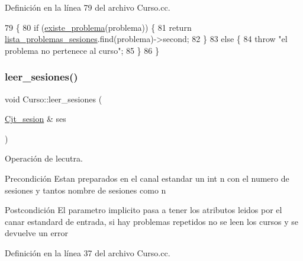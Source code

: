 Definición en la línea 79 del archivo Curso.\+cc.


\begin{DoxyCode}
79                                                        \{
80   \textcolor{keywordflow}{if} (\mbox{\hyperlink{class_curso_ac697ad831382b4e3ccd85365e835344f}{existe\_problema}}(problema)) \{
81     \textcolor{keywordflow}{return} \mbox{\hyperlink{class_curso_a99375622457c06d91cdeede8686f6da5}{lista\_problemas\_sesiones}}.find(problema)->second;
82   \}
83   \textcolor{keywordflow}{else} \{
84     \textcolor{keywordflow}{throw} \textcolor{stringliteral}{"el problema no pertenece al curso"};
85   \}
86 \}
\end{DoxyCode}
\mbox{\label{class_curso_ad60de4c73f3ce9195c0f681f508f83c8}} 
\subsubsection{\texorpdfstring{leer\+\_\+sesiones()}{leer\_sesiones()}}
{\footnotesize\ttfamily void Curso\+::leer\+\_\+sesiones (\begin{DoxyParamCaption}\item[{\mbox{\hyperlink{class_cjt__sesion}{Cjt\+\_\+sesion}} \&}]{ses }\end{DoxyParamCaption})}



Operación de lecutra. 

\begin{DoxyPrecond}{Precondición}
Estan preparados en el canal estandar un int n con el numero de sesiones y tantos nombre de sesiones como n 
\end{DoxyPrecond}
\begin{DoxyPostcond}{Postcondición}
El parametro implicito pasa a tener los atributos leidos por el canar estandard de entrada, si hay problemas repetidos no se leen los cursos y se devuelve un error 
\end{DoxyPostcond}


Definición en la línea 37 del archivo Curso.\+cc.


